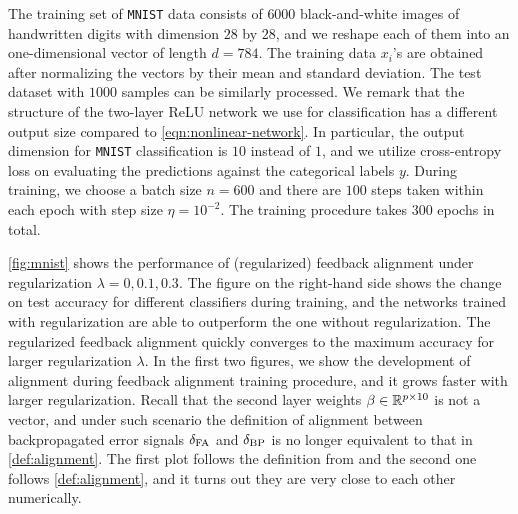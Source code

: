 The training set of \texttt{MNIST} data consists of $6000$ black-and-white images of handwritten digits with dimension $28$ by $28$, and we reshape each of them into an one-dimensional vector of length $d = 784$. The training data $x_i$'s are obtained after normalizing the vectors by their mean and standard deviation. The test dataset with $1000$ samples can be similarly processed. We remark that the structure of the two-layer ReLU network we use for classification has a different output size compared to \eqref{eqn:nonlinear-network}. In particular, the output dimension for \texttt{MNIST} classification is $10$ instead of $1$, and we utilize cross-entropy loss on evaluating the predictions against the categorical labels $y$. During training, we choose a batch size $n = 600$ and there are $100$ steps taken within each epoch with step size $\eta = 10^{-2}$. The training procedure takes $300$ epochs in total. 

\cref{fig:mnist} shows the performance of (regularized) feedback alignment under regularization $\lambda = 0, 0.1, 0.3$. The figure on the right-hand side shows the change on test accuracy for different classifiers during training, and the networks trained with regularization are able to outperform the one without regularization. The regularized feedback alignment quickly converges to the maximum accuracy for larger regularization $\lambda$. In the first two figures, we show the development of alignment during feedback alignment training procedure, and it grows faster with larger regularization. Recall that the second layer weights $\beta\in\mathbb{R}^{p\times 10}$ is not a vector, and under such scenario the definition of alignment between backpropagated error signals $\delta_\mathrm{FA}$ and $\delta_\mathrm{BP}$ is no longer equivalent to that in \cref{def:alignment}. The first plot follows the definition from \citep{lillicrap2016random} and the second one follows \cref{def:alignment}, and it turns out they are very close to each other numerically.

